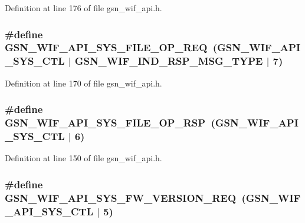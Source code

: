 Definition at line 176 of file gsn\_\-wif\_\-api.h.

\hypertarget{a00606_a75f465637f58de98ccf4e13109751193}{
\subsubsection[{GSN\_\-WIF\_\-API\_\-SYS\_\-FILE\_\-OP\_\-REQ}]{\setlength{\rightskip}{0pt plus 5cm}\#define GSN\_\-WIF\_\-API\_\-SYS\_\-FILE\_\-OP\_\-REQ~(GSN\_\-WIF\_\-API\_\-SYS\_\-CTL $|$ GSN\_\-WIF\_\-IND\_\-RSP\_\-MSG\_\-TYPE $|$ 7)}}
\label{a00606_a75f465637f58de98ccf4e13109751193}


Definition at line 170 of file gsn\_\-wif\_\-api.h.

\hypertarget{a00606_a15ace3ae6990865d2940c7681642cac6}{
\subsubsection[{GSN\_\-WIF\_\-API\_\-SYS\_\-FILE\_\-OP\_\-RSP}]{\setlength{\rightskip}{0pt plus 5cm}\#define GSN\_\-WIF\_\-API\_\-SYS\_\-FILE\_\-OP\_\-RSP~(GSN\_\-WIF\_\-API\_\-SYS\_\-CTL $|$ 6)}}
\label{a00606_a15ace3ae6990865d2940c7681642cac6}


Definition at line 150 of file gsn\_\-wif\_\-api.h.

\hypertarget{a00606_a3dbcf8abb5c0ba6ed779472b6af453c0}{
\subsubsection[{GSN\_\-WIF\_\-API\_\-SYS\_\-FW\_\-VERSION\_\-REQ}]{\setlength{\rightskip}{0pt plus 5cm}\#define GSN\_\-WIF\_\-API\_\-SYS\_\-FW\_\-VERSION\_\-REQ~(GSN\_\-WIF\_\-API\_\-SYS\_\-CTL $|$ 5)}}
\label{a00606_a3dbcf8abb5c0ba6ed779472b6af453c0}


